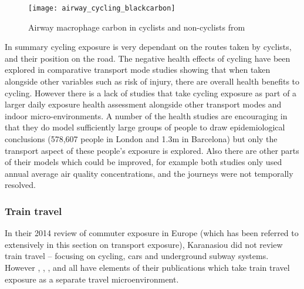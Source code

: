 \begin{figure}[H]
\centering
\texttt{[image: airway\_cycling\_blackcarbon]}
\caption{Airway macrophage carbon in cyclists and non-cyclists from \cite{Nwokoro2012}}
\label{fig:airway_cycling_blackcarbon}
\end{figure}

In summary cycling exposure is very dependant on the routes taken by cyclists, and their position on the road. The negative health effects of cycling have been explored in comparative transport mode studies showing that when taken alongside other variables such as risk of injury, there are overall health benefits to cycling. However there is a lack of studies that take cycling exposure as part of a larger daily exposure health assessment alongside other transport modes and indoor micro-environments. A number of the health studies are encouraging in that they do model sufficiently large groups of people to draw epidemiological conclusions (578,607 people in London and 1.3m in Barcelona) but only the transport aspect of these people's exposure is explored. Also there are other parts of their models which could be improved, for example both studies only used annual average air quality concentrations, and the journeys were not temporally resolved.


\subsubsection{Train travel}
\label{sec:train}

In their 2014 review of commuter exposure in Europe (which has been referred to extensively in this section on transport exposure), Karanasiou did not review train travel -- focusing on cycling, cars and underground subway systems. However \cite{Nasir2009}, \cite{Colbeck2010a}, \cite{Dons2011}, \cite{Ragettli2013} and \cite{Knibbs2011} all have elements of their publications which take train travel exposure as a separate travel microenvironment.

